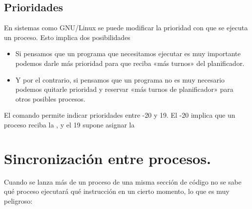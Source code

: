 \documentclass[letterpaper,10pt,spanish]{sphinxmanual}
\begin{document}
\subsection{Prioridades}
\label{\detokenize{textos/tema1:prioridades}}
En sistemas como GNU/Linux se puede modificar la prioridad con que se ejecuta un proceso. Esto implica dos posibilidades
\begin{itemize}
\item {} 
Si pensamos que un programa que necesitamos ejecutar es muy importante podemos darle más prioridad para que reciba «más turnos» del planificador.

\item {} 
Y por el contrario, si pensamos que un programa no es muy necesario podemos quitarle prioridad y reservar «más turnos de planificador» para otros posibles procesos.

\end{itemize}

El comando  permite indicar prioridades entre -20 y 19. El -20 implica que un proceso reciba la , y el 19 supone asignar la 


\section{Sincronización entre procesos.}
\label{\detokenize{textos/tema1:sincronizacion-entre-procesos}}
Cuando se lanza más de un proceso de una misma sección de código no se sabe qué proceso ejecutará qué instrucción en un cierto momento, lo que es muy peligroso:

%
\begin{sphinxVerbatim}[commandchars=\\\{\}]
 
 
\end{sphinxVerbatim}
\end{document}
